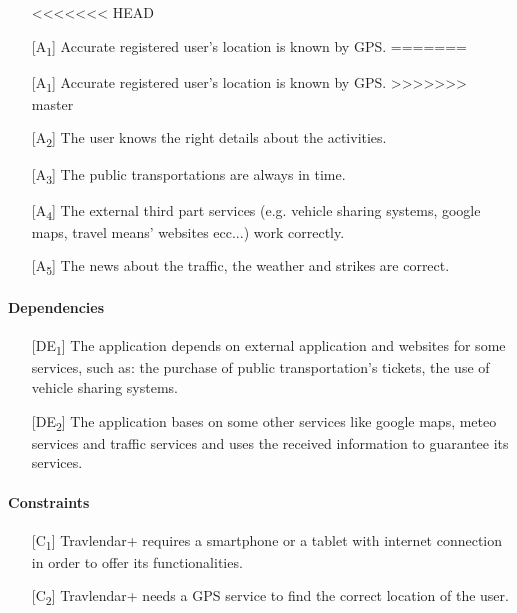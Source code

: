 \documentclass[12pt,titlepage]{article}
\begin{document}
\begin{itemize}
<<<<<<< HEAD
\item[{[A\textsubscript{1}]}]  Accurate registered user's location is known by GPS.
=======
\item [{[A\textsubscript{1}]}]  Accurate registered user's location is known by GPS.
>>>>>>> master
\item [{[A\textsubscript{2}]}] The user knows the right details about the activities.
\item [{[A\textsubscript{3}]}] The public transportations are always in time.
\item [{[A\textsubscript{4}]}] The external third part services (e.g. vehicle sharing systems, google maps, travel means' websites ecc...) work correctly.
\item [{[A\textsubscript{5}]}] The news about the traffic, the weather and strikes are correct.
\end{itemize}

\paragraph{Dependencies}
\begin{itemize}
\item[{[DE\textsubscript{1}]}]  The application depends on external application and websites for some services, such as: the purchase of public transportation's tickets, the use of vehicle sharing systems. 
\item [{[DE\textsubscript{2}]}] The application bases on some other services like google maps, meteo services and traffic services and uses the received information to guarantee its services.
\end{itemize}

\paragraph{Constraints}
\begin{itemize}
\item [{[C\textsubscript{1}]}] Travlendar+ requires a smartphone or a tablet with internet connection in order to offer its functionalities.
\item [{[C\textsubscript{2}]}] Travlendar+ needs a GPS service to find the correct location of the user.

\end{itemize}
\end{document}
